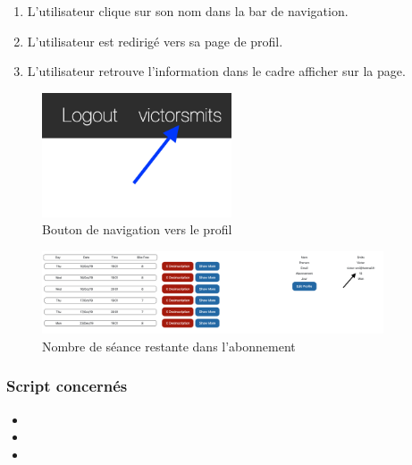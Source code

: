 \begin{enumerate}
	\item L'utilisateur clique sur son nom dans la bar de navigation.
	\item L'utilisateur est redirigé vers sa page de profil. 
	\item L'utilisateur retrouve l'information dans le cadre afficher sur la page.
\end{enumerate}

\vspace{\baselineskip}
\begin{figure}[h]
	\includegraphics[width=0.5\textwidth,center]{Figures/us7-1}
	\caption{Bouton de navigation vers le profil}
\end{figure}

\vspace{\baselineskip}
\begin{figure}[h]
	\includegraphics[width=0.9\textwidth,center]{Figures/us7-2}
	\caption{Nombre de séance restante dans l'abonnement}
\end{figure}


\vspace{\baselineskip}
\subsubsection{Script concernés}
	\begin{itemize}
		\item {}
		\item {}
		\item {}
	\end{itemize}
